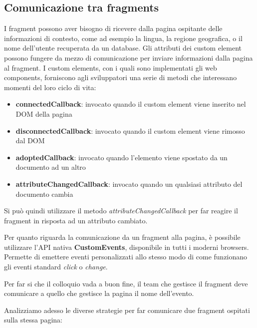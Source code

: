 \subsection{Comunicazione tra fragments}
I fragment possono aver bisogno di ricevere dalla pagina 
ospitante delle informazioni di contesto, come ad esempio la lingua, 
la regione geografica, o il nome dell'utente recuperata da un database.
Gli attributi dei custom element possono fungere da mezzo di comunicazione per inviare
informazioni dalla pagina al fragment.
I custom elements, con i quali sono implementati gli web components, forniscono agli sviluppatori 
una serie di metodi che interessano momenti del loro ciclo di vita:
\begin{itemize}
    \item \textbf{connectedCallback}: invocato quando il custom element viene inserito nel DOM della pagina 
    \item \textbf{disconnectedCallback}: invocato quando il custom element viene rimosso dal DOM
    \item \textbf{adoptedCallback}: invocato quando l'elemento viene spostato da un documento ad un altro
    \item \textbf{attributeChangedCallback}: invocato quando un qualsiasi attributo del documento cambia
\end{itemize}

Si può quindi utilizzare il metodo \emph{attributeChangedCallback} per far reagire il fragment in risposta ad un
attributo cambiato.


Per quanto riguarda la comunicazione da un fragment alla pagina, è possibile utilizzare 
l'API nativa \textbf{CustomEvents}, disponibile in tutti i moderni browsers.
Permette di emettere eventi personalizzati allo stesso modo di come funzionano gli eventi standard \emph{click} o \emph{change}.

Per far si che il colloquio vada a buon fine, il team che gestisce il fragment deve comunicare a quello che gestisce la pagina
il nome dell'evento.

\pagebreak

Analizziamo adesso le diverse strategie per far comunicare due fragment ospitati sulla stessa pagina:

